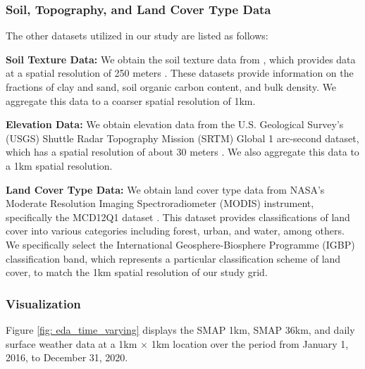 \documentclass[review]{elsarticle}
\begin{document}
\subsubsection*{Soil, Topography, and Land Cover Type Data}
The other datasets utilized in our study are listed as follows:
\begin{description}
\item \textbf{Soil Texture Data:} We obtain the soil texture data from \citet{poggio2021soilgrids}, which provides data at a spatial resolution of 250 meters \citep{hengl2018clay}. These datasets provide information on the fractions of clay and sand, soil organic carbon content, and bulk density. We aggregate this data to a coarser spatial resolution of 1km.


\item \textbf{Elevation Data:}  We obtain elevation data from the U.S. Geological Survey's (USGS) Shuttle Radar Topography Mission (SRTM) Global 1 arc-second dataset, which has a spatial resolution of about 30 meters \citep{farr2007shuttle}. We also aggregate this data to a 1km spatial resolution.
    
    \item \textbf{Land Cover Type Data:} We obtain land cover type data from NASA's Moderate Resolution Imaging Spectroradiometer (MODIS) instrument, specifically the MCD12Q1 dataset \citep{friedl2022modis}. This dataset provides classifications of land cover into various categories including forest, urban, and water, among others. We specifically select the International Geosphere-Biosphere Programme (IGBP) classification band, which represents a particular classification scheme of land cover, to match the 1km spatial resolution of our study grid.
\end{description}
 
 


\subsubsection*{Visualization}
Figure \ref{fig: eda_time_varying} displays the SMAP 1km, SMAP 36km, and daily surface weather data at a 1km $\times$ 1km location over the period from January 1, 2016, to December 31, 2020. 
\end{document}
